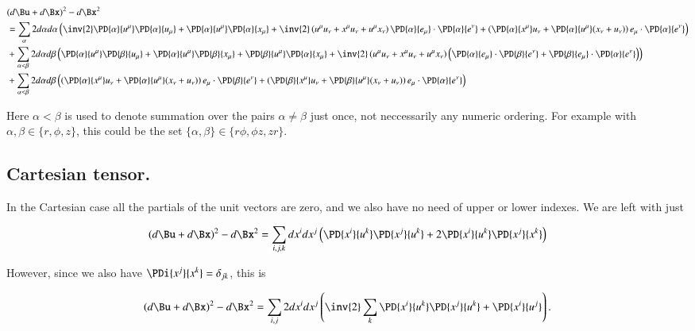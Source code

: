 \begin{equation}\label{eqn:continuumL2:610b}
\begin{aligned}
&(d\Bu + d\Bx)^2 - d\Bx^2 \\
&=
\sum_{\alpha}
2 d\alpha 
d\alpha 
\left( 
\inv{2}
\PD{\alpha}{u^\mu} 
\PD{\alpha}{u_\mu} 
+
\PD{\alpha}{u^\mu} 
\PD{\alpha}{x_\mu} 
+ 
\inv{2}
\left(
u^\mu u_\nu 
+
x^\mu u_\nu 
+
u^\mu x_\nu 
\right)
\PD{\alpha}{e_\mu}
\cdot
\PD{\alpha}{e^\nu} 
+
\left(
\PD{\alpha}{x^\mu}
u_\nu
+
\PD{\alpha}{u^\mu}(
x_\nu
+
u_\nu
)
\right)
e_\mu \cdot 
\PD{\alpha}{e^\nu}
\right) \\
&+
\sum_{\alpha < \beta}
2 d\alpha 
d\beta 
\left( 
\PD{\alpha}{u^\mu} 
\PD{\beta}{u_\mu} 
+
\PD{\alpha}{u^\mu} 
\PD{\beta}{x_\mu} 
+
\PD{\beta}{u^\mu} 
\PD{\alpha}{x_\mu} 
+ 
\inv{2}
\left(
u^\mu u_\nu 
+
x^\mu u_\nu 
+
u^\mu x_\nu 
\right)
\left(
\PD{\alpha}{e_\mu}
\cdot
\PD{\beta}{e^\nu} 
+
\PD{\beta}{e_\mu}
\cdot
\PD{\alpha}{e^\nu} 
\right) 
\right) 
\\
&+
\sum_{\alpha < \beta}
2 d\alpha 
d\beta 
\left( 
\left(
\PD{\alpha}{x^\mu}
u_\nu
+
\PD{\alpha}{u^\mu}(
x_\nu
+
u_\nu
)
\right)
e_\mu \cdot 
\PD{\beta}{e^\nu}
+
\left(
\PD{\beta}{x^\mu}
u_\nu
+
\PD{\beta}{u^\mu}(
x_\nu
+
u_\nu
)
\right)
e_\mu \cdot 
\PD{\alpha}{e^\nu}
\right)
\end{aligned}
\end{equation}

Here $\alpha < \beta$ is used to denote summation over the pairs $\alpha \ne \beta$ just once, not neccessarily any numeric ordering.  For example with $\alpha, \beta \in \{r, \phi, z\}$, this could be the set $\{\alpha, \beta\} \in \{r \phi, \phi z, z r\}$.

\subsection{Cartesian tensor.}

In the Cartesian case all the partials of the unit vectors are zero, and we also have no need of upper or lower indexes.  We are left with just

\begin{equation}\label{eqn:continuumL2:630}
(d\Bu + d\Bx)^2 - d\Bx^2 
=
\sum_{i, j, k}
dx^i
dx^j
\left( 
\PD{x^i}{u^k} 
\PD{x^j}{u^k} 
+
2
\PD{x^i}{u^k} 
\PD{x^j}{x^k} 
\right)
\end{equation}

However, since we also have $\PDi{x^j}{x^k} = \delta_{jk}$, this is

\begin{equation}\label{eqn:continuumL2:650}
(d\Bu + d\Bx)^2 - d\Bx^2 
=
\sum_{i, j}
2
dx^i
dx^j
\left( 
\inv{2}
\sum_k
\PD{x^i}{u^k} 
\PD{x^j}{u^k} 
+
\PD{x^i}{u^j} 
\right).
\end{equation}

